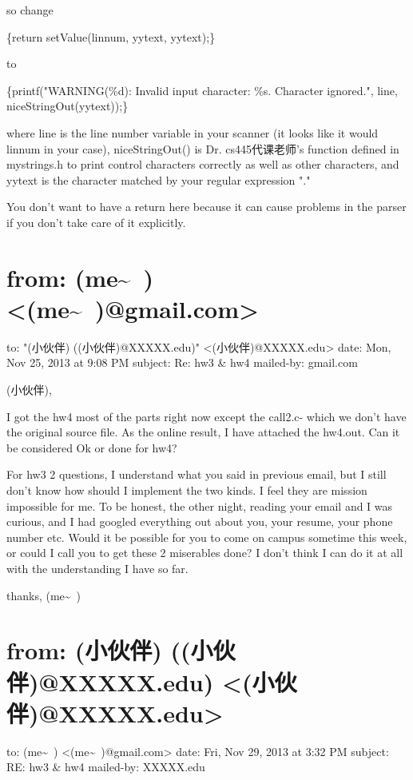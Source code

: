 \documentclass[12pt]{book}
\begin{document}
so change 

\{return setValue(linnum, yytext\footnotemark[2]{}, yytext);\}

to 

\{printf("WARNING(\%d): Invalid input character: \%s. Character ignored.\n", line, niceStringOut(yytext));\}

where line is the line number variable in your scanner (it looks like it would linnum in your case), niceStringOut() is Dr. cs445代课老师's function defined in mystrings.h to print control characters correctly as well as other characters, and yytext is the character matched by your regular expression "." 

You don't want to have a return here because it can cause problems in the parser if you don't take care of it explicitly.


\section{from:         (me\textasciitilde{}~) <(me\textasciitilde{}~)@gmail.com>}
\label{sec-1-5}
to:         "(小伙伴) ((小伙伴)@XXXXX.edu)" <(小伙伴)@XXXXX.edu>
date:         Mon, Nov 25, 2013 at 9:08 PM
subject:         Re: hw3 \& hw4
mailed-by:         gmail.com

(小伙伴), 

I got the hw4 most of the parts right now except the call2.c- which we don't have the original source file. As the online result, I have attached the hw4.out. Can it be considered Ok or done for hw4? 

For hw3 2 questions, I understand what you said in previous email, but I still don't know how should I implement the two kinds. I feel they are mission impossible for me. To be honest, the other night, reading your email and I was curious, and I had googled everything out about you, your resume, your phone number etc. Would it be possible for you to come on campus sometime this week, or could I call you to get these 2 miserables done? I don't think I can do it at all with the understanding I have so far.

thanks,
(me\textasciitilde{}~) 


\section{from:         (小伙伴) ((小伙伴)@XXXXX.edu) <(小伙伴)@XXXXX.edu>}
\label{sec-1-6}
to:         (me\textasciitilde{}~) <(me\textasciitilde{}~)@gmail.com>
date:         Fri, Nov 29, 2013 at 3:32 PM
subject:         RE: hw3 \& hw4
mailed-by:         XXXXX.edu
\end{document}
